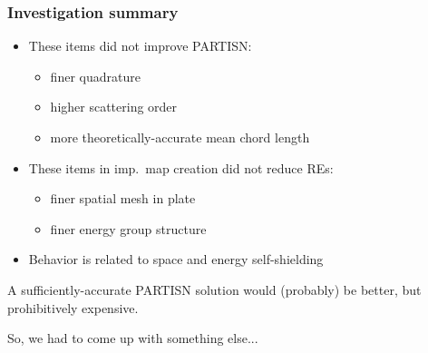 \documentclass[xcolor=x11names,compress]{beamer}
\renewcommand{\(}{\begin{columns}}
\renewcommand{\)}{\end{columns}}
\newcommand{\<}[1]{\begin{column}{#1}}
\renewcommand{\>}{\end{column}}
\begin{document}
\begin{frame}[fragile]
  \frametitle{Investigation summary}
  
	\begin{itemize}
	\item These items did not improve PARTISN:
	 \begin{itemize}
	 \item finer quadrature
	 \item higher scattering order
	 \item more theoretically-accurate mean chord length
	 \end{itemize}
	\pause 
	\item These items in imp.\ map creation did not reduce REs:
	 \begin{itemize}
	 \item finer spatial mesh in plate
	 \item finer energy group structure
	 \end{itemize}
	\pause 
	\item Behavior is related to space and energy self-shielding
	\end{itemize}
\pause
\vspace*{1 em}
A sufficiently-accurate PARTISN solution would (probably) be better, but prohibitively expensive.

\vspace*{1 em}
So, we had to come up with something else...
  
\end{frame}
\end{document}
